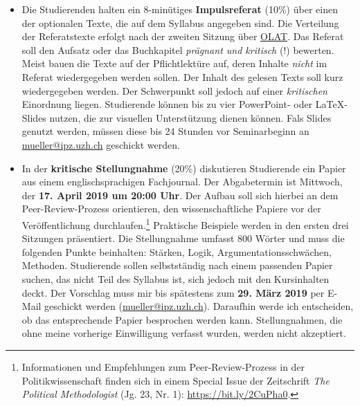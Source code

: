 \documentclass[abstract=on,parskip=full,headings=standardclasses,fontsize=11pt,paper=a4]{scrartcl}
\begin{document}
\begin{itemize}
\item Die Studierenden halten ein 8-minütiges \textbf{Impulsreferat} (10\%)  über einen der optionalen Texte, die auf dem Syllabus angegeben sind. Die Verteilung der Referatstexte erfolgt nach der zweiten Sitzung über \href{https://lms.uzh.ch/url/RepositoryEntry/16539681116?guest=true&lang=en}{OLAT}. Das Referat soll den Aufsatz oder das Buchkapitel \textit{prägnant und kritisch} (!) bewerten. Meist bauen die Texte auf der Pflichtlektüre auf, deren Inhalte \textit{nicht} im Referat wiedergegeben werden sollen. Der Inhalt des gelesen Texts soll kurz wiedergegeben werden. Der Schwerpunkt  soll jedoch auf einer \textit{kritischen} Einordnung liegen.  Studierende können bis zu vier PowerPoint- oder LaTeX-Slides nutzen, die zur visuellen Unterstützung dienen können. Fals Slides genutzt werden, müssen diese bis 24 Stunden vor Seminarbeginn an \href{mailto:mueller@ipz.uzh.ch}{mueller@ipz.uzh.ch} geschickt werden. 

\item In der \textbf{kritische Stellungnahme} (20\%) diskutieren Studierende ein Papier aus einem englischsprachigen Fachjournal. Der Abgabetermin ist Mittwoch, der \textbf{17. April 2019 um 20:00 Uhr}.   Der Aufbau soll sich hierbei an dem Peer-Review-Prozess orientieren, den wissenschaftliche Papiere vor der Veröffentlichung durchlaufen.\footnote{Informationen und Empfehlungen zum Peer-Review-Prozess in der Politikwissenschaft finden sich in einem Special Issue der Zeitschrift \textit{The Political Methodologist}  (Jg. 23, Nr. 1): \url{https://bit.ly/2CuPha0}.} Praktische Beispiele werden in den ersten drei Sitzungen präsentiert. Die Stellungnahme umfasst 800 Wörter und  muss die folgenden Punkte beinhalten: Stärken, Logik, Argumentationsschwächen, Methoden. Studierende sollen selbstständig nach einem passenden Papier suchen, das nicht Teil des Syllabus ist, sich jedoch  mit den Kursinhalten deckt. Der Vorschlag muss mir bis spätestens zum \textbf{29. März 2019}  per E-Mail geschickt werden (\href{mailto:mueller@ipz.uzh.ch}{mueller@ipz.uzh.ch}). Daraufhin werde ich entscheiden, ob das entsprechende Papier besprochen werden kann. Stellungnahmen, die ohne meine vorherige Einwilligung verfasst wurden, werden nicht akzeptiert. 



\end{itemize}
\end{document}
